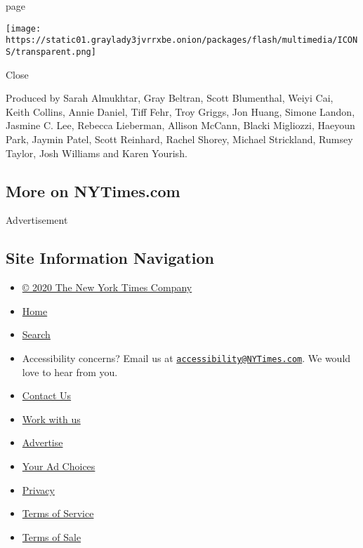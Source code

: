 page

\texttt{[image: https://static01.graylady3jvrrxbe.onion/packages/flash/multimedia/ICONS/transparent.png]}

Close

Produced by Sarah Almukhtar, Gray Beltran, Scott Blumenthal, Weiyi Cai,
Keith Collins, Annie Daniel, Tiff Fehr, Troy Griggs, Jon Huang, Simone
Landon, Jasmine C. Lee, Rebecca Lieberman, Allison McCann, Blacki
Migliozzi, Haeyoun Park, Jaymin Patel, Scott Reinhard, Rachel Shorey,
Michael Strickland, Rumsey Taylor, Josh Williams and Karen Yourish.

\hypertarget{more-on-nytimescom}{%
\subsection{More on NYTimes.com}\label{more-on-nytimescom}}

Advertisement

\hypertarget{site-information-navigation}{%
\subsection{Site Information
Navigation}\label{site-information-navigation}}

\begin{itemize}
\tightlist
\item
  \href{https://help.nytimes3xbfgragh.onion/hc/en-us/articles/115014792127-Copyright-notice}{©
  2020 The New York Times Company}
\item
  \href{https://www.nytimes3xbfgragh.onion}{Home}
\item
  \href{https://www.nytimes3xbfgragh.onion/search/}{Search}
\item
  Accessibility concerns? Email us at
  \href{mailto:accessibility@NYTimes.com}{\nolinkurl{accessibility@NYTimes.com}}.
  We would love to hear from you.
\item
  \href{https://help.nytimes3xbfgragh.onion/hc/en-us/articles/115015385887-Contact-Us}{Contact
  Us}
\item
  \href{https://www.nytco.com/careers/}{Work with us}
\item
  \href{https://nytmediakit.com/}{Advertise}
\item
  \href{https://help.nytimes3xbfgragh.onion/hc/en-us/articles/115014892108-Privacy-policy\#pp}{Your
  Ad Choices}
\item
  \href{https://help.nytimes3xbfgragh.onion/hc/en-us/articles/115014892108-Privacy-policy}{Privacy}
\item
  \href{https://help.nytimes3xbfgragh.onion/hc/en-us/articles/115014893428-Terms-of-service}{Terms
  of Service}
\item
  \href{https://help.nytimes3xbfgragh.onion/hc/en-us/articles/115014893968-Terms-of-sale}{Terms
  of Sale}
\end{itemize}

